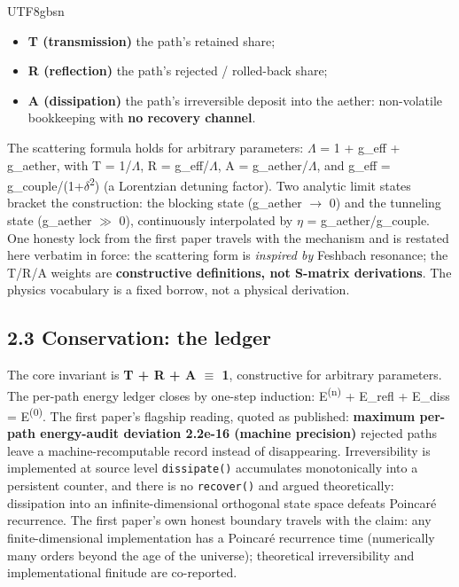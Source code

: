 \documentclass[11pt,letterpaper]{article}
\begin{document}
\begin{CJK}{UTF8}{gbsn}
\begin{itemize}
\item \textbf{T (transmission)} \textemdash{} the path's retained share;
\item \textbf{R (reflection)} \textemdash{} the path's rejected / rolled-back share;
\item \textbf{A (dissipation)} \textemdash{} the path's irreversible deposit into the aether: non-volatile bookkeeping with \textbf{no recovery channel}.
\end{itemize}

The scattering formula holds for arbitrary parameters: \ensuremath{\Lambda} = 1 + g\_eff + g\_aether, with T = 1/\ensuremath{\Lambda}, R = g\_eff/\ensuremath{\Lambda}, A = g\_aether/\ensuremath{\Lambda}, and g\_eff = g\_couple/(1+\ensuremath{\delta}\textsuperscript{2}) (a Lorentzian detuning factor). Two analytic limit states bracket the construction: the blocking state (g\_aether \ensuremath{\to} 0) and the tunneling state (g\_aether \ensuremath{\gg} 0), continuously interpolated by \ensuremath{\eta} = g\_aether/g\_couple. One honesty lock from the first paper travels with the mechanism and is restated here verbatim in force: the scattering form is \emph{inspired by} Feshbach resonance; the T/R/A weights are \textbf{constructive definitions, not S-matrix derivations}. The physics vocabulary is a fixed borrow, not a physical derivation.

\subsection*{2.3 Conservation: the ledger}

The core invariant is \textbf{T + R + A \ensuremath{\equiv} 1}, constructive for arbitrary parameters. The per-path energy ledger closes by one-step induction: E\textsuperscript{(}\textsuperscript{n}\textsuperscript{)} + E\_refl + E\_diss = E\textsuperscript{(}\textsuperscript{0}\textsuperscript{)}. The first paper's flagship reading, quoted as published: \textbf{maximum per-path energy-audit deviation 2.2e-16 (machine precision)} \textemdash{} rejected paths leave a machine-recomputable record instead of disappearing. Irreversibility is implemented at source level \textemdash{} \texttt{dissipate()} accumulates monotonically into a persistent counter, and there is no \texttt{recover()} \textemdash{} and argued theoretically: dissipation into an infinite-dimensional orthogonal state space defeats Poincar\'e recurrence. The first paper's own honest boundary travels with the claim: any finite-dimensional implementation has a Poincar\'e recurrence time (numerically many orders beyond the age of the universe); theoretical irreversibility and implementational finitude are co-reported.


\end{CJK}
\end{document}
